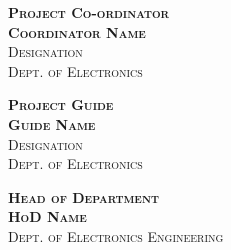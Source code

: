 \vspace{1cm}
\begin{minipage}[b]{0.45\linewidth}\centering
	\begin{flushleft}
		\hspace{-0.5cm}\textbf{\textsc{\normalsize{Project Co-ordinator}}}\\
		\vspace{1cm}
		\hspace{-0.5cm}\textbf{\textsc{\small{Coordinator Name}}}\\
		\hspace{-0.5cm}\textsc{\small{Designation}}\\
		\hspace{-0.5cm}\textsc{\small{Dept. of Electronics}}
	\end{flushleft}
\end{minipage}
\hspace{0.5cm}
\begin{minipage}[b]{0.45\linewidth}
	\begin{flushright}
		\textbf{\textsc{\normalsize{Project Guide}}}\\
		\vspace{1cm}
		\textbf{\textsc{\small{Guide Name}}}\\
		\textsc{\small{Designation}}\\
		\textsc{\small{Dept. of Electronics}}
	\end{flushright}
\end{minipage}
\begin{center}
\textbf{\textsc{\normalsize{Head of Department}}}\\
\vspace{1cm}
\textbf{\textsc{\small{HoD Name}}}\\
\textsc{\small{Dept. of Electronics Engineering}}
\end{center}
